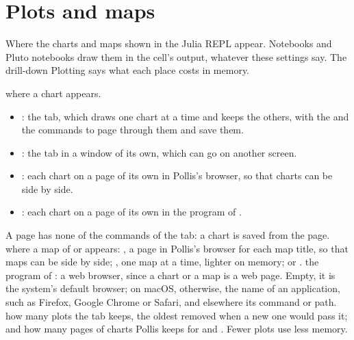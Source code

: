 \section{Plots and maps}\label{sec:plots}
Where the charts and maps shown in the Julia REPL appear. Notebooks and Pluto notebooks draw them in the cell's output,
whatever these settings say. The drill-down Plotting says what each place costs in memory.
\begin{itemize}
    where a chart appears.
    \begin{itemize}
      \item {}: the  tab, which draws one chart at a time and keeps the others, with the
         and the commands to page through them and save them.
      \item {}: the  tab in a window of its own, which can go on another screen.
      \item {}: each chart on a page of its own in Pollis's browser, so that charts can be side by side.
      \item {}: each chart on a page of its own in the program of .
    \end{itemize}
    A page has none of the commands of the  tab: a chart is saved from the page.
    where a map of  or  appears: , a page in Pollis's
    browser for each map title, so that maps can be side by side; , one map at a time, lighter on
    memory; or .
    the program of : a web browser, since a chart or a map is a web page. Empty, it is the
    system's default browser; on macOS, otherwise, the name of an application, such as Firefox, Google Chrome or
    Safari, and elsewhere its command or path.
    how many plots the  tab keeps, the oldest removed when a new one would pass it; and how many pages of
    charts Pollis keeps for  and . Fewer plots use less memory.
\end{itemize}


